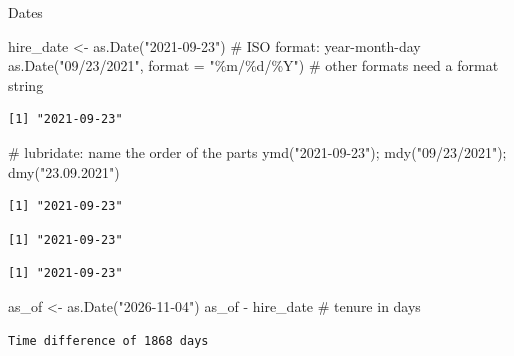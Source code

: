 \documentclass[
  ignorenonframetext,
  aspectratio=169,
]{beamer}
\newenvironment{Shaded}{\begin{snugshade}}{\end{snugshade}}
\newcommand{\AttributeTok}[1]{\textcolor[rgb]{0.40,0.45,0.13}{#1}}
\newcommand{\CommentTok}[1]{\textcolor[rgb]{0.37,0.37,0.37}{#1}}
\newcommand{\FunctionTok}[1]{\textcolor[rgb]{0.28,0.35,0.67}{#1}}
\newcommand{\NormalTok}[1]{\textcolor[rgb]{0.00,0.23,0.31}{#1}}
\newcommand{\OtherTok}[1]{\textcolor[rgb]{0.00,0.23,0.31}{#1}}
\newcommand{\SpecialCharTok}[1]{\textcolor[rgb]{0.37,0.37,0.37}{#1}}
\newcommand{\StringTok}[1]{\textcolor[rgb]{0.13,0.47,0.30}{#1}}
\begin{document}
\begin{frame}[fragile]{Dates}
\protect\hypertarget{dates}{}
\begin{Shaded}
\begin{Highlighting}[]
\NormalTok{hire\_date }\OtherTok{\textless{}{-}} \FunctionTok{as.Date}\NormalTok{(}\StringTok{"2021{-}09{-}23"}\NormalTok{)              }\CommentTok{\# ISO format: year{-}month{-}day}
\FunctionTok{as.Date}\NormalTok{(}\StringTok{"09/23/2021"}\NormalTok{, }\AttributeTok{format =} \StringTok{"\%m/\%d/\%Y"}\NormalTok{)      }\CommentTok{\# other formats need a format string}
\end{Highlighting}
\end{Shaded}

\begin{verbatim}
[1] "2021-09-23"
\end{verbatim}

\begin{Shaded}
\begin{Highlighting}[]
\CommentTok{\# lubridate: name the order of the parts}
\FunctionTok{ymd}\NormalTok{(}\StringTok{"2021{-}09{-}23"}\NormalTok{); }\FunctionTok{mdy}\NormalTok{(}\StringTok{"09/23/2021"}\NormalTok{); }\FunctionTok{dmy}\NormalTok{(}\StringTok{"23.09.2021"}\NormalTok{)}
\end{Highlighting}
\end{Shaded}

\begin{verbatim}
[1] "2021-09-23"
\end{verbatim}

\begin{verbatim}
[1] "2021-09-23"
\end{verbatim}

\begin{verbatim}
[1] "2021-09-23"
\end{verbatim}

\begin{Shaded}
\begin{Highlighting}[]
\NormalTok{as\_of }\OtherTok{\textless{}{-}} \FunctionTok{as.Date}\NormalTok{(}\StringTok{"2026{-}11{-}04"}\NormalTok{)}
\NormalTok{as\_of }\SpecialCharTok{{-}}\NormalTok{ hire\_date                                }\CommentTok{\# tenure in days}
\end{Highlighting}
\end{Shaded}

\begin{verbatim}
Time difference of 1868 days
\end{verbatim}


\end{frame}
\end{document}
